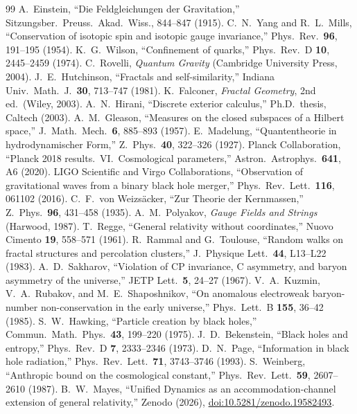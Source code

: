 \documentclass[11pt,twocolumn]{article}
\begin{document}
\begin{thebibliography}{99}
 A.~Einstein, ``Die Feldgleichungen der Gravitation,'' Sitzungsber.\ Preuss.\ Akad.\ Wiss., 844--847 (1915).
 C.~N.~Yang and R.~L.~Mills, ``Conservation of isotopic spin and isotopic gauge invariance,'' Phys.\ Rev.\ \textbf{96}, 191--195 (1954).
 K.~G.~Wilson, ``Confinement of quarks,'' Phys.\ Rev.\ D \textbf{10}, 2445--2459 (1974).
 C.~Rovelli, \textit{Quantum Gravity} (Cambridge University Press, 2004).
 J.~E.~Hutchinson, ``Fractals and self-similarity,'' Indiana Univ.\ Math.\ J.\ \textbf{30}, 713--747 (1981).
 K.~Falconer, \textit{Fractal Geometry}, 2nd ed.\ (Wiley, 2003).
 A.~N.~Hirani, ``Discrete exterior calculus,'' Ph.D.\ thesis, Caltech (2003).
 A.~M.~Gleason, ``Measures on the closed subspaces of a Hilbert space,'' J.\ Math.\ Mech.\ \textbf{6}, 885--893 (1957).
 E.~Madelung, ``Quantentheorie in hydrodynamischer Form,'' Z.\ Phys.\ \textbf{40}, 322--326 (1927).
 Planck Collaboration, ``Planck 2018 results.\ VI.\ Cosmological parameters,'' Astron.\ Astrophys.\ \textbf{641}, A6 (2020).
 LIGO Scientific and Virgo Collaborations, ``Observation of gravitational waves from a binary black hole merger,'' Phys.\ Rev.\ Lett.\ \textbf{116}, 061102 (2016).
 C.~F.~von Weizs\"acker, ``Zur Theorie der Kernmassen,'' Z.\ Phys.\ \textbf{96}, 431--458 (1935).
 A.~M.~Polyakov, \textit{Gauge Fields and Strings} (Harwood, 1987).
 T.~Regge, ``General relativity without coordinates,'' Nuovo Cimento \textbf{19}, 558--571 (1961).
 R.~Rammal and G.~Toulouse, ``Random walks on fractal structures and percolation clusters,'' J.\ Physique Lett.\ \textbf{44}, L13--L22 (1983).
 A.~D.~Sakharov, ``Violation of CP invariance, C asymmetry, and baryon asymmetry of the universe,'' JETP Lett.\ \textbf{5}, 24--27 (1967).
 V.~A.~Kuzmin, V.~A.~Rubakov, and M.~E.~Shaposhnikov, ``On anomalous electroweak baryon-number non-conservation in the early universe,'' Phys.\ Lett.\ B \textbf{155}, 36--42 (1985).
 S.~W.~Hawking, ``Particle creation by black holes,'' Commun.\ Math.\ Phys.\ \textbf{43}, 199--220 (1975).
 J.~D.~Bekenstein, ``Black holes and entropy,'' Phys.\ Rev.\ D \textbf{7}, 2333--2346 (1973).
 D.~N.~Page, ``Information in black hole radiation,'' Phys.\ Rev.\ Lett.\ \textbf{71}, 3743--3746 (1993).
 S.~Weinberg, ``Anthropic bound on the cosmological constant,'' Phys.\ Rev.\ Lett.\ \textbf{59}, 2607--2610 (1987).
 B.~W.~Mayes, ``Unified Dynamics as an accommodation-channel extension of general relativity,'' Zenodo (2026), \href{https://doi.org/10.5281/zenodo.19582493}{doi:10.5281/zenodo.19582493}.
\end{thebibliography}
\end{document}
